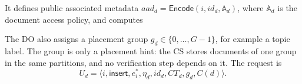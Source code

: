 
It defines public associated metadata $aad_d = \mathsf{Encode}(i, id_d, \mathbb{A}_d)$, where
$\mathbb{A}_d$ is the document access policy, and computes



The DO also assigns a placement group $g_d \in \{0,\dots,G-1\}$, for example a topic label.
The group is only a placement hint: the CS stores documents of one group in the same partitions,
and no verification step depends on it. The request is
\begin{equation}
U_d = \langle i, \mathsf{insert}, e_i^{*}, \eta_d, id_d, CT_d, g_d, C(d) \rangle .
\end{equation}






